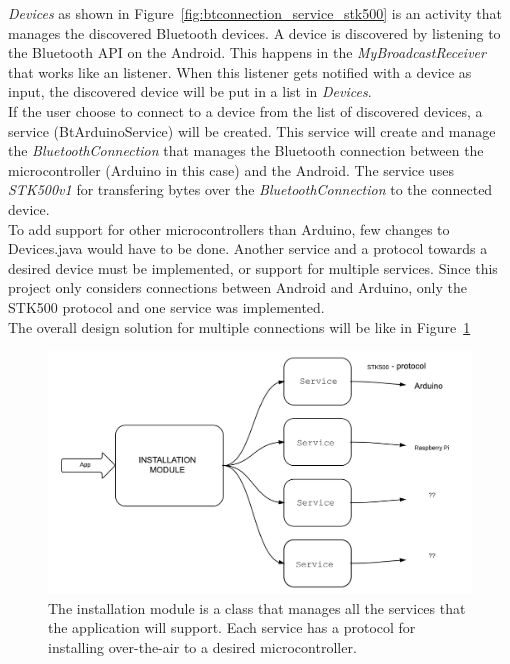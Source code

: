 	\textit{Devices} as shown in Figure~\ref{fig:btconnection_service_stk500} is an activity that manages the discovered Bluetooth devices. A device is discovered by listening to the Bluetooth API on the Android. This happens in the \textit{MyBroadcastReceiver} that works like an listener. When this listener gets notified with a device as input, the discovered device will be put in a list in \textit{Devices}.\\

	If the user choose to connect to a device from the list of discovered devices, a service (BtArduinoService) will be created. This service will create and manage the \textit{BluetoothConnection} that manages the Bluetooth connection between the microcontroller (Arduino in this case) and the Android. The service uses \textit{STK500v1} for transfering bytes over the \textit{BluetoothConnection} to the connected device.\\

	To add support for other microcontrollers than Arduino, few changes to Devices.java would have to be done. Another service and a protocol towards a desired device must be implemented, or support for multiple services. Since this project only considers connections between Android and Arduino, only the STK500 protocol and one service was implemented.\\

	The overall design solution for multiple connections will be like in Figure~\ref{fig:otaarchitecture}\\
	\begin{figure}[H]
	\includegraphics[scale=0.7]{figures/OTAArchitecture.pdf}
	\caption[Over The Air Architecture]{The installation module is a class that manages all the services that the application will support. Each service has a protocol for installing over-the-air to a desired microcontroller.}
	\label{fig:otaarchitecture}
	\end{figure}

